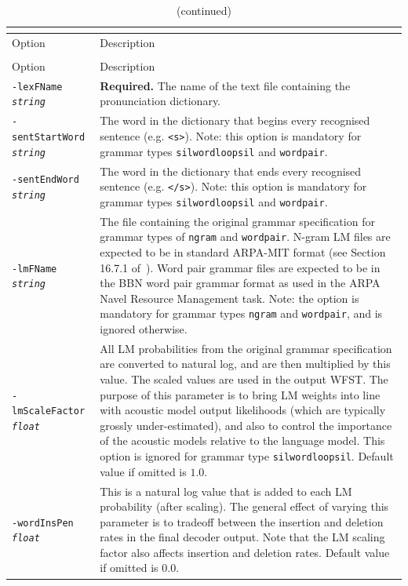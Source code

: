 \documentclass[a4paper,12pt]{report}
\begin{document}
\begin{center}
\begin{longtable}{lp{9cm}}
\caption{Detailed description of {\tt gramgen} command line options.} \\
\label{tab:gramgen_ref} \\
\hline
Option & Description \\
\hline
\endfirsthead
\caption{(continued)} \\
\hline
Option & Description \\
\hline
\endhead
\hline
\endfoot
{\tt -lexFName \emph{string}} & {\bf Required.} The name of the text file containing the pronunciation dictionary. \\
{\tt -sentStartWord \emph {string}} & The word in the dictionary that begins every recognised sentence (e.g. {\tt <s>}). Note: this option is mandatory for grammar types {\tt silwordloopsil} and {\tt wordpair}. \\
{\tt -sentEndWord \emph{string}} & The word in the dictionary that ends every recognised sentence (e.g. {\tt </s>}). Note: this option is mandatory for grammar types {\tt silwordloopsil} and {\tt wordpair}. \\
{\tt -lmFName \emph{string}} & The file containing the original grammar specification for grammar types of {\tt ngram} and {\tt wordpair}. N-gram LM files are expected to be in standard ARPA-MIT format (see Section 16.7.1 of~\cite{htkbook321}). Word pair grammar files are expected to be in the BBN word pair grammar format as used in the ARPA Navel Resource Management task. Note: the option is mandatory for grammar types {\tt ngram} and {\tt wordpair}, and is ignored otherwise. \\
{\tt -lmScaleFactor \emph{float}} & All LM probabilities from the original grammar specification are converted to natural log, and are then multiplied by this value. The scaled values are used in the output WFST. The purpose of this parameter is to bring LM weights into line with acoustic model output likelihoods (which are typically grossly under-estimated), and also to control the importance of the acoustic models relative to the language model. This option is ignored for grammar type {\tt silwordloopsil}. Default value if omitted is $1.0$. \\
{\tt -wordInsPen \emph{float}} & This is a natural log value that is added to each LM probability (after scaling). The general effect of varying this parameter is to tradeoff between the insertion and deletion rates in the final decoder output. Note that the LM scaling factor also affects insertion and deletion rates. Default value if omitted is $0.0$. \\

\end{longtable}
\end{center}
\end{document}
